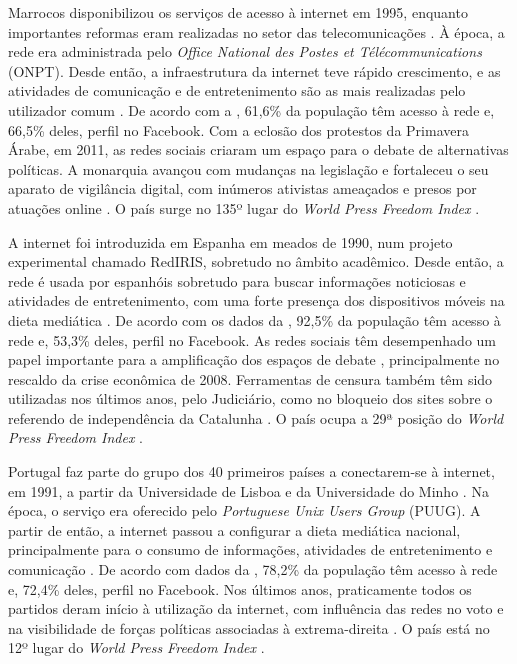 \documentclass{textolivre}
\begin{document}
Marrocos disponibilizou os serviços de acesso à internet em 1995, enquanto importantes reformas eram realizadas no setor das telecomunicações \cite{clark1998}. À época, a rede era administrada pelo \emph{Office National des Postes et Télécommunications} (ONPT). Desde então, a infraestrutura da internet teve rápido crescimento, e as atividades de comunicação e de entretenimento são as mais realizadas pelo utilizador comum \cite{constant2011}. De acordo com a \textcite{internet2019a}, 61,6\% da população têm acesso à rede e, 66,5\% deles, perfil no Facebook. Com a eclosão dos protestos da Primavera Árabe, em 2011, as redes sociais criaram um espaço para o debate de alternativas políticas. A monarquia avançou com mudanças na legislação e fortaleceu o seu aparato de vigilância digital, com inúmeros ativistas ameaçados e presos por atuações online \cite{zaid2016}. O país surge no 135º lugar do \emph{World Press Freedom Index} \cite{reporteres2019}.

A internet foi introduzida em Espanha em meados de 1990, num projeto experimental chamado RedIRIS, sobretudo no âmbito acadêmico. Desde então, a rede é usada por espanhóis sobretudo para buscar informações noticiosas e atividades de entretenimento, com uma forte presença dos dispositivos móveis na dieta mediática \cite{aimc2019}. De acordo com os dados da \textcite{internet2019b}, 92,5\% da população têm acesso à rede e, 53,3\% deles, perfil no Facebook. As redes sociais têm desempenhado um papel importante para a amplificação dos espaços de debate \cite{camposdominguez2017}, principalmente no rescaldo da crise econômica de 2008. Ferramentas de censura também têm sido utilizadas nos últimos anos, pelo Judiciário, como no bloqueio dos sites sobre o referendo de independência da Catalunha \cite{poblet2018}. O país ocupa a 29ª posição do \emph{World Press Freedom Index} \cite{reporteres2019}.

Portugal faz parte do grupo dos 40 primeiros países a conectarem-se à internet, em 1991, a partir da Universidade de Lisboa e da Universidade do Minho \cite{souza2017}. Na época, o serviço era oferecido pelo \emph{Portuguese Unix Users Group} (PUUG). A partir de então, a internet passou a configurar a dieta mediática nacional, principalmente para o consumo de informações, atividades de entretenimento e comunicação \cite{cardoso2006}. De acordo com dados da \textcite{internet2019b}, 78,2\% da população têm acesso à rede e, 72,4\% deles, perfil no Facebook. Nos últimos anos, praticamente todos os partidos deram início à utilização da internet, com influência das redes no voto \cite{magalhaes2008} e na visibilidade de forças políticas associadas à extrema-direita \cite{palma2021}. O país está no 12º lugar do \emph{World Press Freedom Index} \cite{reporteres2019}.
\end{document}
